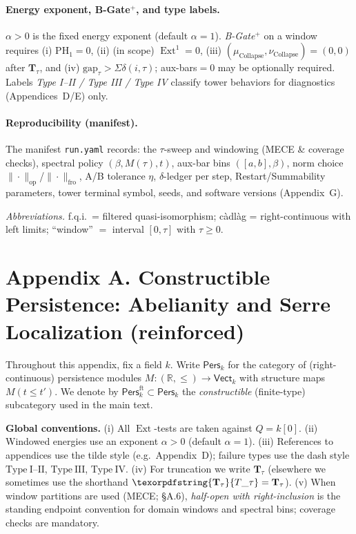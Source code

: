 \documentclass[11pt]{article}
\DeclareMathOperator{\Ext}{Ext}
\DeclareRobustCommand{\hyp}{\nobreakdash-}
\newcommand{\Pers}{\mathsf{Pers}}
\numberwithin{equation}{section}
\theoremstyle{definition}
\DeclareRobustCommand{\Ttau}{\texorpdfstring{\ensuremath{\mathbf{T}_{\tau}}}{T\_\tau}}
\DeclareRobustCommand{\muc}{\mu_{\mathrm{Collapse}}}
\DeclareRobustCommand{\nuc}{\nu_{\mathrm{Collapse}}}
\begin{document}
\paragraph{Energy exponent, B\hyp Gate\(^{+}\), and type labels.}
\(\alpha>0\) is the fixed energy exponent (default \(\alpha=1\)).
\emph{B\hyp Gate\(^{+}\)} on a window requires (i) \(\mathrm{PH}_1=0\), (ii) (in scope) \(\Ext^1=0\), (iii) \((\muc,\nuc)=(0,0)\) after \(\mathbf{T}_\tau\), and (iv) \(\mathrm{gap}_\tau>\Sigma\delta(i,\tau)\); aux\hyp bars\(=0\) may be optionally required.
Labels \emph{Type I–II / Type III / Type IV} classify tower behaviors for diagnostics (Appendices~D/E) only.

\paragraph{Reproducibility (manifest).}
The manifest \texttt{run.yaml} records: the \(\tau\)\hyp sweep and windowing (MECE \& coverage checks), spectral policy \((\beta,M(\tau),t)\), aux\hyp bar bins \(([a,b],\beta)\), norm choice \(\|\cdot\|_{\mathrm{op}}\)/\(\|\cdot\|_{\mathrm{fro}}\), A/B tolerance \(\eta\), \(\delta\)\hyp ledger per step, Restart/Summability parameters, tower terminal symbol, seeds, and software versions (Appendix~G).

\medskip
\noindent\emph{Abbreviations.}
f.q.i.\ = filtered quasi\hyp isomorphism;\quad
c\`adl\`ag = right\hyp continuous with left limits;\quad
“window” \(=\) interval \([0,\tau]\) with \(\tau\ge0\).




\appendix
\section*{Appendix A. Constructible Persistence: Abelianity and Serre Localization (reinforced)}


Throughout this appendix, fix a field \(k\).
Write \(\Pers_k\) for the category of (right-continuous) persistence modules
\(M:(\mathbb{R},\le)\to\mathsf{Vect}_k\) with structure maps \(M(t\le t')\).
We denote by \(\Pers^{\mathrm{ft}}_k\subset\Pers_k\) the \emph{constructible} (finite-type) subcategory used in the main text.

\medskip
\noindent\textbf{Global conventions.}
(i) All \(\Ext\)-tests are taken against \(Q=k[0]\).
(ii) Windowed energies use an exponent \(\alpha>0\) (default \(\alpha=1\)).
(iii) References to appendices use the tilde style (e.g.\ Appendix~D); failure types use the dash style
\(\mathrm{Type\ I\text{--}II}\), \(\mathrm{Type\ III}\), \(\mathrm{Type\ IV}\).
(iv) For truncation we write \(\mathbf{T}_\tau\) (elsewhere we sometimes use the shorthand \(\Ttau=\mathbf{T}_\tau\)).
(v) When window partitions are used (MECE; §A.6), \emph{half-open with right-inclusion} is the standing endpoint convention for domain windows and spectral bins; coverage checks are mandatory.
\end{document}
